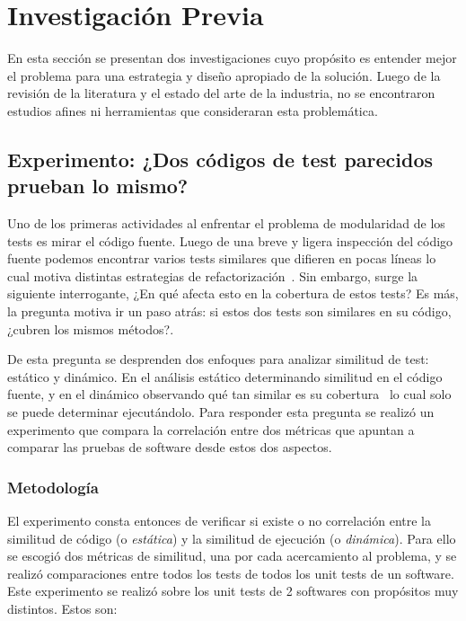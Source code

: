 \chapter{Investigación Previa}

\par En esta sección se presentan dos investigaciones cuyo propósito es entender mejor el problema para una estrategia y diseño apropiado de la solución. Luego de la revisión de la literatura y el estado del arte de la industria, no se encontraron estudios afines ni herramientas que consideraran esta problemática.


\section{Experimento: ¿Dos códigos de test parecidos prueban lo mismo? }

\par Uno de los primeras actividades al enfrentar el problema de modularidad de los tests es mirar el código fuente. Luego de una breve y ligera inspección del código fuente podemos encontrar varios tests similares que difieren en pocas líneas lo cual motiva distintas estrategias de refactorización~\cite{roy2007survey,rattan2013software,Kosc13a}. Sin embargo, surge la siguiente interrogante, ¿En qué afecta esto en la cobertura de estos tests? Es más, la pregunta motiva ir un paso atrás: si estos dos tests son similares en su código, ¿cubren los mismos métodos?.

\par De esta pregunta se desprenden dos enfoques para analizar similitud de test: estático y dinámico. En el análisis estático determinando similitud en el código fuente, y en el dinámico observando qué tan similar es su cobertura~\cite{Horwi02a} lo cual solo se puede determinar ejecutándolo. Para responder esta pregunta se realizó un experimento que compara la correlación entre dos métricas que apuntan a comparar las pruebas de software desde estos dos aspectos.

\subsection{Metodología}

\par El experimento consta entonces de verificar si existe o no correlación entre la similitud de código (o \emph{estática}) y la similitud de ejecución (o \emph{dinámica}). Para ello se escogió dos métricas de similitud, una por cada acercamiento al problema, y se realizó comparaciones entre todos los tests de todos los unit tests de un software. Este experimento se realizó sobre los unit tests de 2 softwares con propósitos muy distintos. Estos son: 

